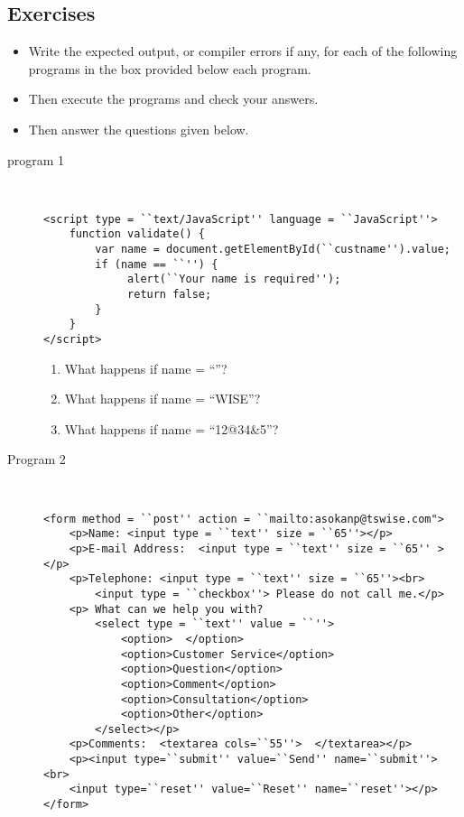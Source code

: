 \documentclass[11pt,a4paper]{article}
\def\AnswerBox{\fbox{\begin{minipage}{4in}\hfill\vspace{0.5in}\end{minipage}}}
\begin{document}
\subsection*{Exercises}
\begin{itemize}
\item Write the expected output, or compiler errors if any, for each of the following programs in the box provided below each program.
\item Then execute the programs and check your answers.
\item Then answer the questions given below.
\end{itemize}
\begin{description}
\item[program 1]\
\begin{lstlisting}
<script type = ``text/JavaScript'' language = ``JavaScript''>
    function validate() {
        var name = document.getElementById(``custname'').value;
        if (name == ``'') {
             alert(``Your name is required'');
             return false;
        }
    }
</script>
\end{lstlisting}

\AnswerBox

\begin{enumerate}[label=\bfseries Q\arabic*:]\itemsep10pt
\item What happens if name = ``''?
\item What happens if name = ``WISE''?
\item What happens if name = ``12@34\&5''?

\end{enumerate}

\item[Program 2]\
\begin{lstlisting}
<form method = ``post'' action = ``mailto:asokanp@tswise.com">
    <p>Name: <input type = ``text'' size = ``65''></p>
    <p>E-mail Address:  <input type = ``text'' size = ``65'' ></p>
    <p>Telephone: <input type = ``text'' size = ``65''><br>
        <input type = ``checkbox''> Please do not call me.</p>
    <p> What can we help you with?
        <select type = ``text'' value = ``''>
            <option>  </option>
            <option>Customer Service</option>
            <option>Question</option>
            <option>Comment</option>
            <option>Consultation</option>
            <option>Other</option>
        </select></p>
    <p>Comments:  <textarea cols=``55''>  </textarea></p>
    <p><input type=``submit'' value=``Send'' name=``submit''><br>
    <input type=``reset'' value=``Reset'' name=``reset''></p>
</form>
\end{lstlisting}


\end{description}
\end{document}
